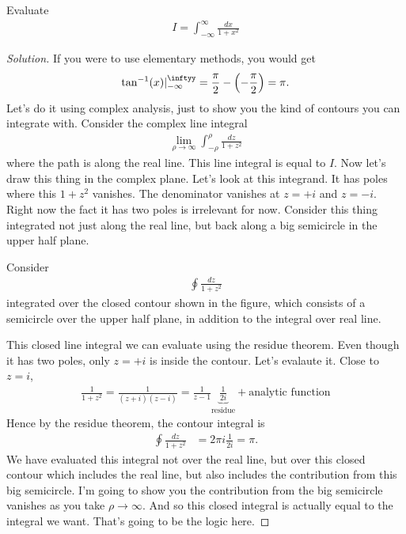 \begin{example}
    Evaluate
    \begin{align}
        I = \int_{-\infty}^{\infty}
        \frac{dx}{1 + x^2}
    \end{align}
\end{example}
\begin{proof}[Solution]
    If you were to use elementary methods,
    you would get
    \begin{align}
        \tan^{-1}(x)|_{-\infty}^{\inftyy}
        = \frac{\pi}{2}
        - \left( -\frac{\pi}{2} \right)
        = \pi.
    \end{align}
    Let's do it using complex analysis,
    just to show you the kind of contours you can integrate with.
    Consider the complex line integral
    \begin{align}
        \lim_{\rho\to\infty}
        \int_{-\rho}^{\rho}
        \frac{dz}{1 + z^2}
    \end{align}
    where the path is along the real line.
    This line integral is equal to $I$.
    Now let's draw this thing in the complex plane.
    Let's look at this integrand.
    It has poles where this $1+z^2$ vanishes.
    The denominator vanishes at $z=+i$ and $z=-i$.
    Right now the fact it has two poles is irrelevant for now.
    Consider this thing integrated not just along the real line,
    but back along a big semicircle in the upper half plane.

    Consider
    \begin{align}
        \oint \frac{dz}{1 + z^2}
    \end{align}
    integrated over the closed contour shown in the figure,
    which consists of a semicircle over the upper half plane,
    in addition to the integral over real line.

    This closed line integral we can evaluate using the residue theorem.
    Even though it has two poles,
    only $z=+i$ is inside the contour.
    Let's evalaute it.
    Close to $z=i$,
    \begin{align}
        \frac{1}{1 + z^2} = \frac{1}{(z + i)(z - i)}
        = \frac{1}{z - 1} \underbrace{\frac{1}{2i}}_{\text{residue}}
        + \text{analytic function}
    \end{align}
    Hence by the residue theorem, the contour integral is
    \begin{align}
        \oint \frac{dz}{1 + z^2} &=
        2\pi i \frac{1}{2i} = \pi.
    \end{align}
    We have evaluated this integral not over the real line,
    but over this closed contour which includes the real line,
    but also includes the contribution from this big semicircle.
    I'm going to show you the contribution from the big semicircle vanishes as
    you take $\rho\to\infty$.
    And so this closed integral is actually equal to the integral we want.
    That's going to be the logic here.


\end{proof}

